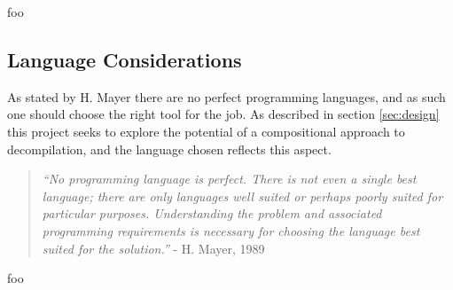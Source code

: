 foo



\subsection{Language Considerations}


As stated by H. Mayer there are no perfect programming languages, and as such one should choose the right tool for the job. As described in section \ref{sec:design} this project seeks to explore the potential of a compositional approach to decompilation, and the language chosen reflects this aspect.

\begin{quote}
	\textit{``No programming language is perfect. There is not even a single best language; there are only languages well suited or perhaps poorly suited for particular purposes. Understanding the problem and associated programming requirements is necessary for choosing the language best suited for the solution.''} - H. Mayer, 1989 \cite{no_perfect_lang_quote}
\end{quote}





foo

